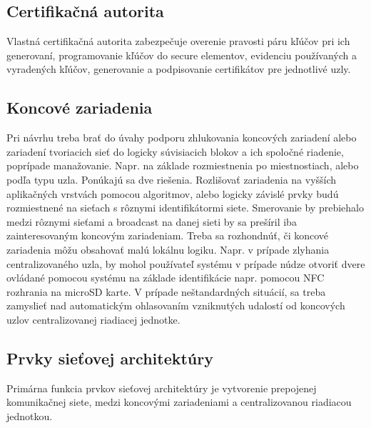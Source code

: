 \documentclass[12pt,a4paper,oneside,openright]{report}
\begin{document}
\subsection{Certifikačná autorita}
Vlastná certifikačná autorita zabezpečuje overenie pravosti páru kľúčov pri ich generovaní, programovanie kľúčov do secure elementov, evidenciu používaných a vyradených kľúčov, generovanie a podpisovanie certifikátov pre jednotlivé uzly.

\subsection{Koncové zariadenia} 
Pri návrhu treba brať do úvahy podporu zhlukovania koncových zariadení alebo zariadení tvoriacich sieť do logicky súvisiacich blokov a ich spoločné riadenie, poprípade manažovanie. Napr. na základe rozmiestnenia po miestnostiach, alebo podľa typu uzla. Ponúkajú sa dve riešenia. Rozlišovať zariadenia na vyšších aplikačných vrstvách pomocou algoritmov, alebo logicky závislé prvky budú rozmiestnené na sieťach s rôznymi identifikátormi siete. Smerovanie by prebiehalo medzi rôznymi sieťami a broadcast na danej sieti by sa prešíril iba zainteresovaným koncovým zariadeniam.
Treba sa rozhondnúť, či koncové zariadenia môžu obsahovať malú lokálnu logiku. Napr. v prípade zlyhania centralizovaného uzla, by mohol používateľ systému v prípade núdze otvoriť dvere ovládané pomocou systému na základe identifikácie napr. pomocou NFC rozhrania na microSD karte.
V prípade neštandardných situácií, sa treba zamyslieť nad automatickým ohlasovaním vzniknutých udalostí od koncových uzlov centralizovanej riadiacej jednotke.

\subsection{Prvky sieťovej architektúry}
Primárna funkcia prvkov sieťovej architektúry je vytvorenie prepojenej komunikačnej siete, medzi koncovými zariadeniami a centralizovanou riadiacou jednotkou.
\end{document}
